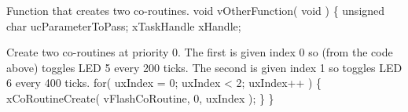 \begin{DoxyPre}Function that creates two co-routines.
 void vOtherFunction( void )
 \{
 unsigned char ucParameterToPass;
 xTaskHandle xHandle;\end{DoxyPre}



\begin{DoxyPre}Create two co-routines at priority 0.  The first is given index 0
so (from the code above) toggles LED 5 every 200 ticks.  The second
is given index 1 so toggles LED 6 every 400 ticks.
     for( uxIndex = 0; uxIndex < 2; uxIndex++ )
     \{
         xCoRoutineCreate( vFlashCoRoutine, 0, uxIndex );
     \}
 \}
   \end{DoxyPre}
 